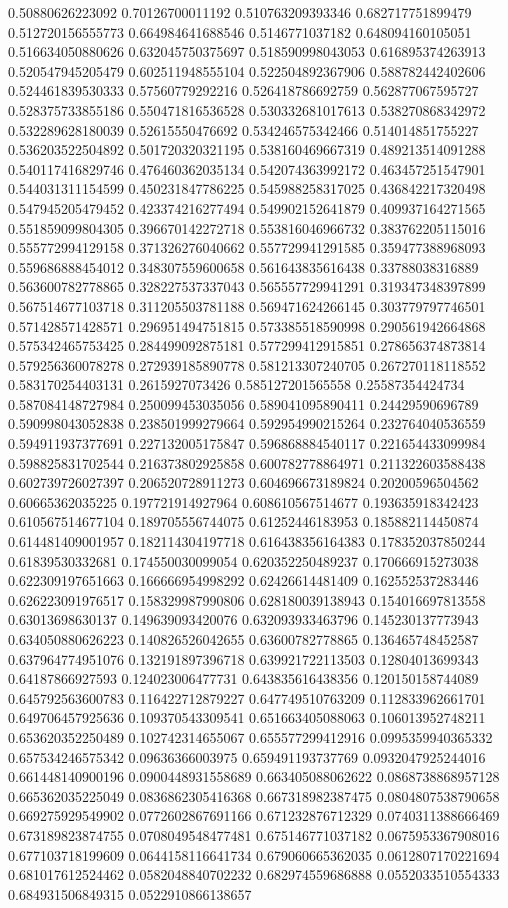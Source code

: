 \begin{table}
\begin{tabu}
\begin{sparkline}{10}
0.50880626223092 0.70126700011192 0.510763209393346 0.682717751899479 0.512720156555773 0.664984641688546 0.5146771037182 0.648094160105051 0.516634050880626 0.632045750375697 0.518590998043053 0.616895374263913 0.520547945205479 0.602511948555104 0.522504892367906 0.588782442402606 0.524461839530333 0.57560779292216 0.526418786692759 0.562877067595727 0.528375733855186 0.550471816536528 0.530332681017613 0.538270868342972 0.532289628180039 0.52615550476692 0.534246575342466 0.514014851755227 0.536203522504892 0.501720320321195 0.538160469667319 0.489213514091288 0.540117416829746 0.476460362035134 0.542074363992172 0.463457251547901 0.544031311154599 0.450231847786225 0.545988258317025 0.436842217320498 0.547945205479452 0.423374216277494 0.549902152641879 0.409937164271565 0.551859099804305 0.396670142272718 0.553816046966732 0.383762205115016 0.555772994129158 0.371326276040662 0.557729941291585 0.359477388968093 0.559686888454012 0.348307559600658 0.561643835616438 0.33788038316889 0.563600782778865 0.328227537337043 0.565557729941291 0.319347348397899 0.567514677103718 0.311205503781188 0.569471624266145 0.303779797746501 0.571428571428571 0.296951494751815 0.573385518590998 0.290561942664868 0.575342465753425 0.284499092875181 0.577299412915851 0.278656374873814 0.579256360078278 0.272939185890778 0.581213307240705 0.267270118118552 0.583170254403131 0.2615927073426 0.585127201565558 0.25587354424734 0.587084148727984 0.250099453035056 0.589041095890411 0.24429590696789 0.590998043052838 0.238501999279664 0.592954990215264 0.232764040536559 0.594911937377691 0.227132005175847 0.596868884540117 0.221654433099984 0.598825831702544 0.216373802925858 0.600782778864971 0.211322603588438 0.602739726027397 0.206520728911273 0.604696673189824 0.20200596504562 0.60665362035225 0.197721914927964 0.608610567514677 0.193635918342423 0.610567514677104 0.189705556744075 0.61252446183953 0.185882114450874 0.614481409001957 0.182114304197718 0.616438356164383 0.178352037850244 0.61839530332681 0.174550030099054 0.620352250489237 0.170666915273038 0.622309197651663 0.166666954998292 0.62426614481409 0.162552537283446 0.626223091976517 0.158329987990806 0.628180039138943 0.154016697813558 0.63013698630137 0.149639093420076 0.632093933463796 0.145230137773943 0.634050880626223 0.140826526042655 0.63600782778865 0.136465748452587 0.637964774951076 0.132191897396718 0.639921722113503 0.12804013699343 0.64187866927593 0.124023006477731 0.643835616438356 0.120150158744089 0.645792563600783 0.116422712879227 0.647749510763209 0.112833962661701 0.649706457925636 0.109370543309541 0.651663405088063 0.106013952748211 0.653620352250489 0.102742314655067 0.655577299412916 0.0995359940365332 0.657534246575342 0.09636366003975 0.659491193737769 0.0932047925244016 0.661448140900196 0.0900448931558689 0.663405088062622 0.0868738868957128 0.665362035225049 0.0836862305416368 0.667318982387475 0.0804807538790658 0.669275929549902 0.0772602867691166 0.671232876712329 0.0740311388666469 0.673189823874755 0.0708049548477481 0.675146771037182 0.0675953367908016 0.677103718199609 0.0644158116641734 0.679060665362035 0.0612807170221694 0.681017612524462 0.0582048840702232 0.682974559686888 0.0552033510554333 0.684931506849315 0.0522910866138657 
\end{sparkline}
\end{tabu}
\end{table}
